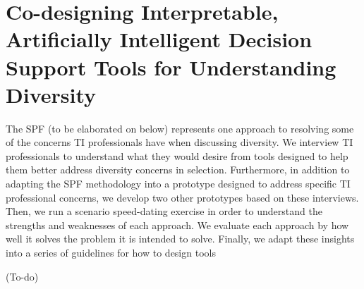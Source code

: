 \section{Co-designing Interpretable, Artificially Intelligent Decision Support Tools for Understanding Diversity}
The SPF (to be elaborated on below) represents one approach to resolving some of the concerns TI professionals have when discussing diversity. We interview TI professionals to understand what they would desire from tools designed to help them better address diversity concerns in selection. Furthermore, in addition to adapting the SPF methodology into a prototype designed to address specific TI professional concerns, we develop two other prototypes based on these interviews. Then, we run a scenario speed-dating exercise in order to understand the strengths and weaknesses of each approach. We evaluate each approach by how well it solves the problem it is intended to solve. Finally, we adapt these insights into a series of guidelines for how to design tools 

(To-do)